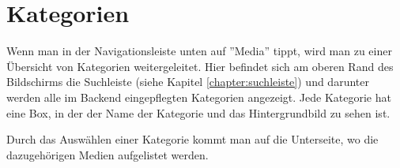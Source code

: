 \section{Kategorien}

Wenn man in der Navigationsleiste unten auf ''Media'' tippt, wird man zu einer Übersicht von Kategorien weitergeleitet.
Hier befindet sich am oberen Rand des Bildschirms die Suchleiste (siehe Kapitel \ref{chapter:suchleiste}) und darunter
werden alle im Backend eingepflegten Kategorien angezeigt. Jede Kategorie hat eine Box, in der der Name der Kategorie
und das Hintergrundbild zu sehen ist.

Durch das Auswählen einer Kategorie kommt man auf die Unterseite, wo die dazugehörigen Medien aufgelistet werden.

\begin{figure}[H]
    \begin{minipage}{0.5\textwidth}
        \centering

\end{minipage}
\end{figure}
